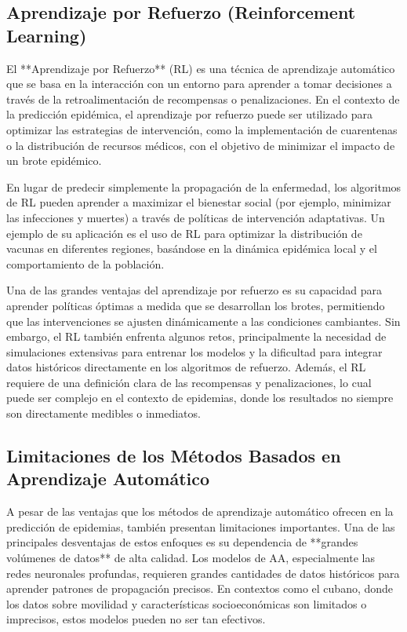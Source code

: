 \subsection{Aprendizaje por Refuerzo (Reinforcement Learning)}

El **Aprendizaje por Refuerzo** (RL) es una técnica de aprendizaje automático que se basa en la interacción con un entorno para aprender a tomar decisiones a través de la retroalimentación de recompensas o penalizaciones. En el contexto de la predicción epidémica, el aprendizaje por refuerzo puede ser utilizado para optimizar las estrategias de intervención, como la implementación de cuarentenas o la distribución de recursos médicos, con el objetivo de minimizar el impacto de un brote epidémico.

En lugar de predecir simplemente la propagación de la enfermedad, los algoritmos de RL pueden aprender a maximizar el bienestar social (por ejemplo, minimizar las infecciones y muertes) a través de políticas de intervención adaptativas. Un ejemplo de su aplicación es el uso de RL para optimizar la distribución de vacunas en diferentes regiones, basándose en la dinámica epidémica local y el comportamiento de la población.

Una de las grandes ventajas del aprendizaje por refuerzo es su capacidad para aprender políticas óptimas a medida que se desarrollan los brotes, permitiendo que las intervenciones se ajusten dinámicamente a las condiciones cambiantes. Sin embargo, el RL también enfrenta algunos retos, principalmente la necesidad de simulaciones extensivas para entrenar los modelos y la dificultad para integrar datos históricos directamente en los algoritmos de refuerzo. Además, el RL requiere de una definición clara de las recompensas y penalizaciones, lo cual puede ser complejo en el contexto de epidemias, donde los resultados no siempre son directamente medibles o inmediatos.

\subsection{Limitaciones de los Métodos Basados en Aprendizaje Automático}

A pesar de las ventajas que los métodos de aprendizaje automático ofrecen en la predicción de epidemias, también presentan limitaciones importantes. Una de las principales desventajas de estos enfoques es su dependencia de **grandes volúmenes de datos** de alta calidad. Los modelos de AA, especialmente las redes neuronales profundas, requieren grandes cantidades de datos históricos para aprender patrones de propagación precisos. En contextos como el cubano, donde los datos sobre movilidad y características socioeconómicas son limitados o imprecisos, estos modelos pueden no ser tan efectivos.

